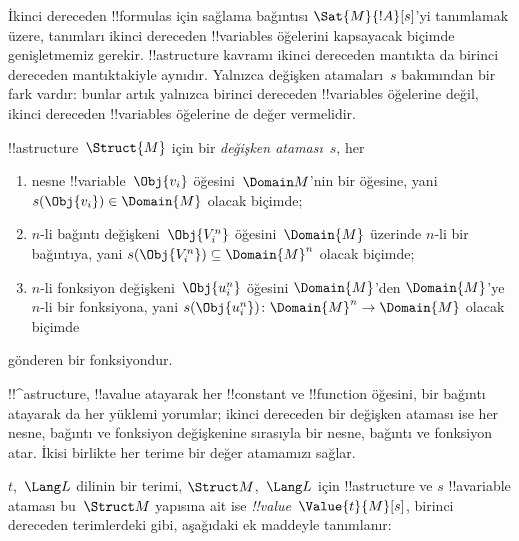\documentclass[../../../include/open-logic-section]{subfiles}
\begin{document}


\begin{explain}
İkinci dereceden !!{formula}s için sağlama bağıntısı $\Sat{M}{!A}[s]$'yi
tanımlamak üzere, tanımları ikinci dereceden !!{variable}s öğelerini
kapsayacak biçimde genişletmemiz gerekir. !!a{structure} kavramı ikinci
dereceden mantıkta da birinci dereceden mantıktakiyle aynıdır. Yalnızca
değişken atamaları~$s$ bakımından bir fark vardır: bunlar artık yalnızca
birinci dereceden !!{variable}s öğelerine değil, ikinci dereceden
!!{variable}s öğelerine de değer vermelidir.
\end{explain}

\begin{defn}
!!a{structure}~$\Struct{M}$ için bir \emph{değişken ataması}~$s$, her
\begin{enumerate}
\item nesne !!{variable}~$\Obj{v_i}$ öğesini~$\Domain M$'nin bir öğesine,
  yani $s(\Obj{v_i}) \in \Domain{M}$ olacak biçimde;
\item $n$-li bağıntı değişkeni~$\Obj{V_i^n}$ öğesini~$\Domain{M}$ üzerinde
  $n$-li bir bağıntıya, yani $s(\Obj{V_i^n}) \subseteq \Domain{M}^n$
  olacak biçimde;
\item $n$-li fonksiyon değişkeni~$\Obj{u_i^n}$ öğesini $\Domain{M}$'den
  $\Domain{M}$'ye $n$-li bir fonksiyona, yani
  $s(\Obj{u_i^n})\colon \Domain{M}^n \to \Domain{M}$ olacak biçimde
\end{enumerate}
gönderen bir fonksiyondur.
\end{defn}

\begin{explain}
!!^a{structure}, !!a{value} atayarak her !!{constant} ve !!{function}
öğesini, bir bağıntı atayarak da her yüklemi yorumlar; ikinci dereceden bir değişken ataması ise her
nesne, bağıntı ve fonksiyon değişkenine sırasıyla bir nesne, bağıntı ve
fonksiyon atar. İkisi birlikte her terime bir değer atamamızı sağlar.
\end{explain}

\begin{defn}
$t$,~$\Lang L$ dilinin bir terimi, $\Struct M$,~$\Lang L$ için
!!a{structure} ve $s$ !!a{variable} ataması bu~$\Struct M$ yapısına ait ise
\emph{!!{value}}~$\Value{t}{M}[s]$, birinci dereceden terimlerdeki gibi,
aşağıdaki ek maddeyle tanımlanır:
\begin{quote}
\end{quote}
\end{defn}
\end{document}
